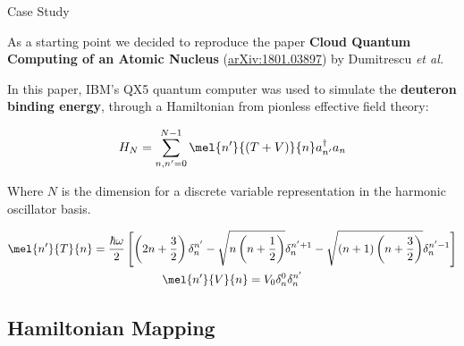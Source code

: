 \documentclass[9pt, handout, aspectratio=169]{beamer}		%
\begin{document}
	\begin{frame}{Case Study}

		As a starting point we decided to reproduce the paper \textbf{Cloud Quantum Computing of an Atomic Nucleus} (\href{https://arxiv.org/abs/1801.03897}{arXiv:1801.03897}) by Dumitrescu \textit{et al.}

		\medskip

		In this paper, IBM's QX5 quantum computer was used to simulate the \textbf{deuteron binding energy}, through a Hamiltonian from pionless effective field theory:

		\begin{align*}
			H_N = \sum^{N-1}_{n,n'=0} \mel{n'}{(T+V)}{n}a^{\dagger}_{n'}a_{n}
		\end{align*}

		Where $N$ is the dimension for a discrete variable representation in the harmonic oscillator basis.

		\begin{gather*}
			\mel{n'}{T}{n} = \frac{\hbar \omega}{2} \left[
				\left( 2n + \frac{3}{2} \right) \delta_n^{n'} -
				\sqrt{ n \left( n + \frac{1}{2} \right) } \delta_n^{n'+1} -
				\sqrt{ \left( n + 1 \right) \left( n + \frac{3}{2} \right) } \delta_n^{n'-1} \right] \\
			\mel{n'}{V}{n} = V_0 \delta_n^0 \delta_n^{n'}
		\end{gather*}

	\end{frame}


	\subsection{Hamiltonian Mapping}
\end{document}
